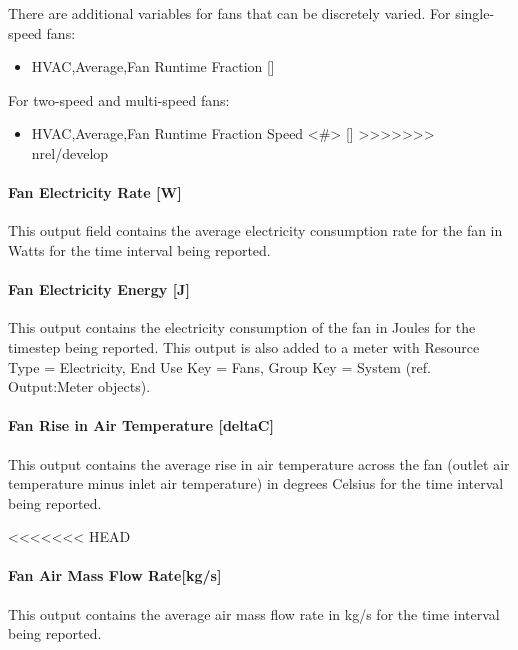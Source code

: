 There are additional variables for fans that can be discretely varied.
For single-speed fans:

\begin{itemize}
\item
  HVAC,Average,Fan Runtime Fraction {[]}
\end{itemize}

For two-speed and multi-speed fans:

\begin{itemize}
\item
  HVAC,Average,Fan Runtime Fraction Speed <\#> {[]}
>>>>>>> nrel/develop
\end{itemize}

\paragraph{Fan Electricity Rate {[}W{]}}\label{fan-electric-power-fansysmodel}

This output field contains the average electricity consumption rate for the fan in Watts for the time interval being reported.

\paragraph{Fan Electricity Energy {[}J{]}}\label{fan-electric-energy-fansysmodel}

This output contains the electricity consumption of the fan in Joules for the timestep being reported. This output is also added to a meter with Resource Type = Electricity, End Use Key = Fans, Group Key = System (ref. Output:Meter objects).

\paragraph{Fan Rise in Air Temperature {[}deltaC{]}}\label{fan-rise-in-air-temperature-deltac-fansysmodel}

This output contains the average rise in air temperature across the fan (outlet air temperature minus inlet air temperature) in degrees Celsius for the time interval being reported.

<<<<<<< HEAD
\paragraph{Fan Air Mass Flow Rate{[}kg/s{]}}\label{fan-air-mass-flow-fansysmodel}

This output contains the average air mass flow rate in kg/s for the time interval being reported.

